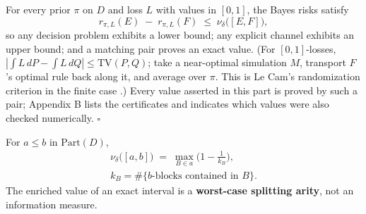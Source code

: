 \begin{thmplain}

For every prior \(\pi\) on \(D\) and loss \(L\) with values in \([0,1]\), the Bayes risks satisfy
\[
r_{\pi, L}(E) \;-\; r_{\pi, L}(F) \;\le\; \nu_\delta\big([E,F]\big),
\]
so any decision problem exhibits a lower bound; any explicit channel exhibits an upper bound; and a matching pair proves an exact value. (For \([0,1]\)-losses, \(|\!\int L\, dP - \int L\, dQ| \le \mathrm{TV}(P,Q)\); take a near-optimal simulation \(M\), transport \(F\)'s optimal rule back along it, and average over \(\pi\). This is Le Cam's randomization criterion in the finite case \autocite{lecam1964,torgersen1991}.) Every value asserted in this part is proved by such a pair; Appendix B lists the certificates and indicates which values were also checked numerically. \(\square\)
\end{thmplain}



\begin{thmplain}

For \(a \le b\) in \(\mathrm{Part}(D)\),
\[\begin{gathered}\nu_\delta\big([a, b]\big) \;=\; \max_{B \in a} \Big(1 - \tfrac{1}{k_B}\Big), \\ k_B = \#\{\text{$b$-blocks contained in } B\}.\end{gathered}\]
The enriched value of an exact interval is a \textbf{worst-case splitting arity}, not an information measure.
\end{thmplain}

